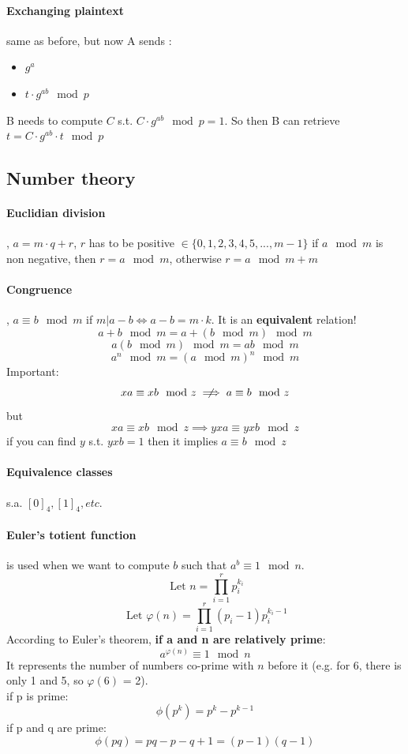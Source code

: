 \documentclass{article}
\begin{document}
\paragraph{Exchanging plaintext} same as before, but now A sends :
\begin{itemize}
    \item $ g^a $
    \item $ t \cdot {g^{ab} \mod p} $
\end{itemize}
B needs to compute $ C $ s.t. $ C \cdot g^{ab} \mod p = 1 $.
So then B can retrieve $ t = C \cdot g^{ab} \cdot t \mod p $

\newpage

\subsection{Number theory}

\paragraph{Euclidian division}, $ a = m \cdot q + r $, $ r $ has to be positive $ \in \{0,1,2,3,4,5,...,m-1\}$
if $ a \mod m $ is non negative, then $ r = a \mod m $, otherwise $ r = a \mod m + m $

\paragraph{Congruence}, $ a \equiv b \mod m $ if $ m | a - b \Leftrightarrow a - b = m \cdot k$. It is an \textbf{equivalent} relation!\\
\[ a + b \mod m = a + (b \mod m) \mod m \]
\[ a (b \mod m) \mod m = ab \mod m \]
\[ a^n \mod m = (a \mod m)^n \mod m \]
Important:
\[ xa \equiv xb \mod z \centernot\implies a \equiv b \mod z \]
but
\[ xa \equiv xb \mod z \implies yxa \equiv yxb \mod z \]
if you can find $ y $ s.t. $ yxb = 1 $ then it implies $ a \equiv b \mod z$

\paragraph{Equivalence classes} s.a. $ [0]_4, [1]_4, etc. $

\paragraph{Euler's totient function} is used when we want to compute $ b $ such that $ a^b \equiv 1 \mod{n}$.
\[ \text{ Let } n = \prod_{i = 1}^{r} p_i^{k_i}\]
\[ \text{ Let } \varphi{(n)} = \prod_{i = 1}^{r} (p_i - 1)p_i^{k_i-1} \]
According to Euler's theorem, \textbf{if a and n are relatively prime}:
\[ a^{\varphi(n)} \equiv 1 \mod{n} \]
It represents the number of numbers co-prime with $ n $ before it (e.g. for 6, there is only 1 and 5, so $\varphi(6)$ = 2).\\
if p is prime:
\[ \phi(p^k) = p^k - p^{k-1} \]
if p and q are prime:
\[ \phi(pq) = pq - p - q + 1 = (p-1)(q-1) \]
\end{document}
